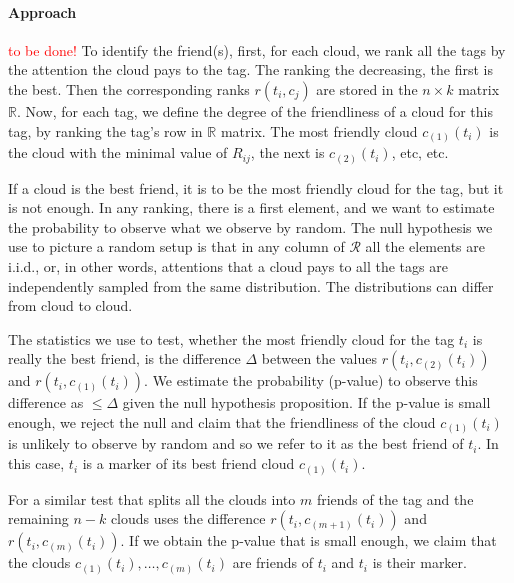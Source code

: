 \documentclass{llncs}
\begin{document}
\paragraph{Approach} \textcolor{red}{to be done!} To identify the friend(s), first, for each cloud, we rank all the tags by the attention the cloud pays to the tag. The ranking the decreasing, the first is the best. Then the corresponding ranks $r(t_i,c_j)$ are stored in the $n\times k$ matrix $\mathbb{R}$. Now, for each tag, we define the degree of the friendliness of a cloud for this tag, by ranking the tag's row in $\mathbb{R}$ matrix. The most friendly cloud $c_{(1)}(t_i)$ is the cloud with the minimal value of $R_{ij}$, the next is $c_{(2)}(t_i)$, etc, etc. 

If a cloud is the best friend, it is to be the most friendly cloud for the tag, but it is not enough. In any ranking, there is a first element, and we want to estimate the probability to observe what we observe by random. The null hypothesis we use to picture a random setup is that in any column of $\mathcal{R}$ all the elements are i.i.d., or, in other words, attentions that a cloud pays to all the tags are independently sampled from the same distribution. The distributions can differ from cloud to cloud. 

The statistics we use to test, whether the most friendly cloud for the tag $t_i$ is really the best friend, is the difference $\Delta$ between the values $r(t_i,c_{(2)}(t_i))$ and $r(t_i,c_{(1)}(t_i))$. We estimate the probability (p-value) to observe this difference as $\leq \Delta$ given the null hypothesis proposition. If the p-value is small enough, we reject the null and claim that the friendliness of the cloud $c_{(1)}(t_i)$ is unlikely to observe by random and so we refer to it as the best friend of $t_i$. In this case, $t_i$ is a marker of its best friend cloud $c_{(1)}(t_i)$.

For a similar test that splits all the clouds into $m$ friends of the tag and the remaining $n-k$ clouds uses the difference  $r(t_i,c_{(m+1)}(t_i))$ and $r(t_i,c_{(m)}(t_i))$. If we obtain the p-value that is small enough, we claim that the clouds $c_{(1)}(t_i), \dots, c_{(m)}(t_i)$ are friends of $t_i$ and $t_i$ is their marker.



\end{document}
